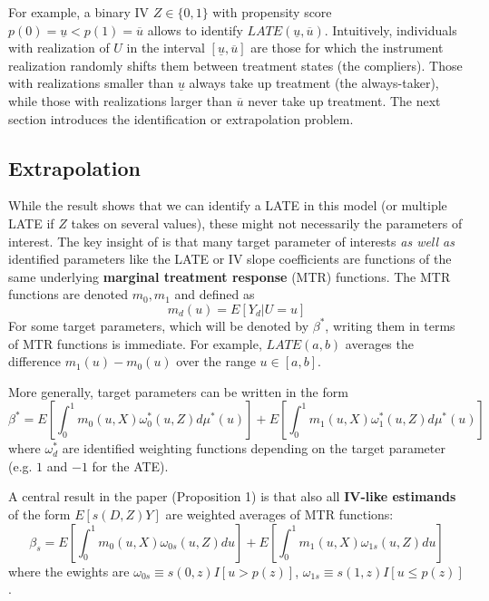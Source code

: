 \documentclass{article}
\begin{document}
For example, a binary IV $Z\in\{0,1\}$ with propensity score $p(0) = \underline{u} < p(1) = \overline{u}$ allows to identify $LATE(\underline{u},\overline{u})$.
Intuitively, individuals with realization of $U$ in the interval $[\underline{u}, \overline{u}]$ are those for which the instrument realization randomly shifts them between treatment states (the compliers).
Those with realizations smaller than $\underline{u}$ always take up treatment (the always-taker), while those with realizations larger than $\overline{u}$ never take up treatment.
The next section introduces the identification or extrapolation problem.

\subsection{Extrapolation}
While the \citet{imbens1994identification} result shows that we can identify a LATE in this model (or multiple LATE if $Z$ takes on several values), these might not necessarily the parameters of interest.
The key insight of \citet{mogstad2018using} is that many target parameter of interests \textit{as well as} identified parameters like the LATE or IV slope coefficients are functions of the same underlying \textbf{marginal treatment response} (MTR) functions.
The MTR functions are denoted $m_0, m_1$ and defined as 
\begin{equation}
    m_d(u) = E[Y_d|U=u]
\end{equation}
For some target parameters, which will be denoted by $\beta^*$, writing them in terms of MTR functions is immediate. 
For example, $LATE(a,b)$ averages the difference $m_1(u) - m_0(u)$ over the range $u\in[a,b]$.

More generally, target parameters can be written in the form
\begin{equation}
    \beta^* = E\left[\int_0^1 m_0(u,X)\omega_0^*(u,Z)d\mu^*(u)\right] + E\left[\int_0^1 m_1(u,X)\omega_1^*(u,Z)d\mu^*(u)\right]
\end{equation}
where $\omega_{d}^*$ are identified weighting functions depending on the target parameter (e.g. $1$ and $-1$ for the ATE).

A central result in the paper (Proposition 1) is that also all \textbf{IV-like estimands} of the form $E[s(D,Z)Y]$ are weighted averages of MTR functions:
\begin{equation}
    \beta_s = 
    E\left[\int_0^1 m_0(u,X)\omega_{0s}(u,Z)du\right] 
    + E\left[\int_0^1 m_1(u,X)\omega_{1s}(u,Z)du\right]
\end{equation}
where the ewights are $\omega_{0s} \equiv s(0,z)I[u>p(z)]$, $\omega_{1s} \equiv s(1,z)I[u\leq p(z)]$.
\end{document}
